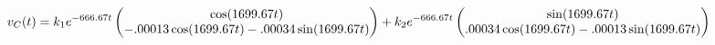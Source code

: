 \documentclass[preview]{standalone}
\begin{document}
\begin{center}
\[
                                                v_C(t) = k_1e^{-666.67t} 
                                                \begin{pmatrix} 
                                                        \cos(1699.67t) \\ 
                                                        -.00013\cos(1699.67t) - .00034\sin(1699.67t)
                                                \end{pmatrix}
                                                + \\
                                                k_2e^{-666.67t} 
                                                \begin{pmatrix} 
                                                        \sin(1699.67t) \\ 
                                                        .00034\cos(1699.67t) - .00013\sin(1699.67t)
                                                \end{pmatrix}
                                                \]
\end{center}
\end{document}
